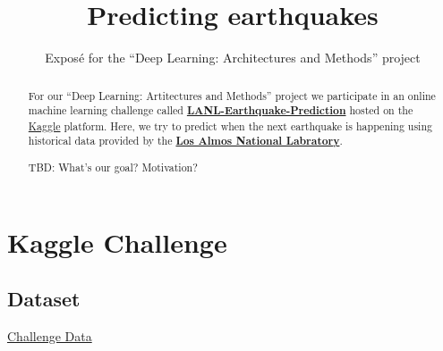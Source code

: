 \documentclass[colorback,accentcolor=tud9c,12pt]{tudreport}
\title{Predicting earthquakes}
\subtitle{Expos\'{e} for the ``Deep Learning: Architectures and Methods'' project}
\begin{document}
	\maketitle
	\begin{abstract}
		For our ``Deep Learning: Artitectures and Methods'' project we participate in an online machine learning challenge called 
		\textbf{\href{https://www.kaggle.com/c/LANL-Earthquake-Prediction/overview}{LANL-Earthquake-Prediction}} hosted on the \href{https://www.kaggle.com}{Kaggle} platform.
		Here, we try to predict when the next earthquake is happening using historical data provided by the \textbf{\href{https://www.lanl.gov/}{Los Almos National Labratory}}.
		
		TBD: What's our goal? Motivation?
	\end{abstract}
	
	\chapter{Kaggle Challenge}
	
	\section{Dataset}
	
	\href{https://www.kaggle.com/c/LANL-Earthquake-Prediction/data}{Challenge Data}
\end{document}
